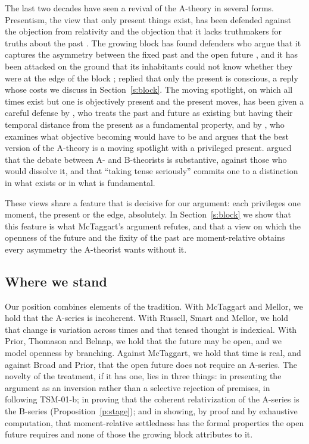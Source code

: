 \documentclass{situationist-preprint}
\begin{document}
The last two decades have seen a revival of the A-theory in several forms. Presentism, the view that only present things exist, has been defended against the objection from relativity and the objection that it lacks truthmakers for truths about the past \citep{Markosian2004}. The growing block has found defenders who argue that it captures the asymmetry between the fixed past and the open future \citep{Tooley1997,CorreiaRosenkranz2018}, and it has been attacked on the ground that its inhabitants could not know whether they were at the edge of the block \citep{Bourne2002,BraddonMitchell2004}; \citet{Forrest2004} replied that only the present is conscious, a reply whose costs we discuss in Section~\ref{s:block}. The moving spotlight, on which all times exist but one is objectively present and the present moves, has been given a careful defense by \citet{Cameron2015}, who treats the past and future as existing but having their temporal distance from the present as a fundamental property, and by \citet{Skow2015}, who examines what objective becoming would have to be and argues that the best version of the A-theory is a moving spotlight with a privileged present. \citet{Zimmerman2005} argued that the debate between A- and B-theorists is substantive, against those who would dissolve it, and that \enquote{taking tense seriously} commits one to a distinction in what exists or in what is fundamental.

These views share a feature that is decisive for our argument: each privileges one moment, the present or the edge, absolutely. In Section~\ref{s:block} we show that this feature is what McTaggart's argument refutes, and that a view on which the openness of the future and the fixity of the past are moment-relative obtains every asymmetry the A-theorist wants without it.

\subsection{Where we stand}

Our position combines elements of the tradition. With McTaggart and Mellor, we hold that the A-series is incoherent. With Russell, Smart and Mellor, we hold that change is variation across times and that tensed thought is indexical. With Prior, Thomason and Belnap, we hold that the future may be open, and we model openness by branching. Against McTaggart, we hold that time is real, and against Broad and Prior, that the open future does not require an A-series. The novelty of the treatment, if it has one, lies in three things: in presenting the argument as an inversion rather than a selective rejection of premises, in following TSM-01-b; in proving that the coherent relativization of the A-series is the B-series (Proposition~\ref{p:stage}); and in showing, by proof and by exhaustive computation, that moment-relative settledness has the formal properties the open future requires and none of those the growing block attributes to it.
\end{document}
